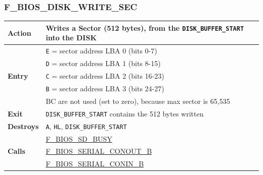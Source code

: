 \documentclass[a4paper,11pt]{article}
\begin{document}
        \subsubsection{F\_BIOS\_DISK\_WRITE\_SEC}
        \label{func:fbiosdiskwritesec}
        \begin{tabular}{l p{9cm}}
            \hline\textbf{Action}
            & Writes a Sector (512 bytes), from the \texttt{DISK\_BUFFER\_START}
            into the \textbf{DISK}\\
            \hline\multirow[t]{5}{4em}{\textbf{Entry}}
            & \texttt{E} = sector address LBA 0 (bits 0-7) \\
            & \texttt{D} = sector address LBA 1 (bits 8-15) \\
            & \texttt{C} = sector address LBA 2 (bits 16-23) \\
            & \texttt{B} = sector address LBA 3 (bits 24-27) \\
            & BC are not used (set to zero), because max sector is 65,535\\
            \hline\textbf{Exit} & \texttt{DISK\_BUFFER\_START} contains the 512 bytes written \\
            \hline\textbf{Destroys} & \texttt{A}, \texttt{HL}, \texttt{DISK\_BUFFER\_START} \\
            \hline\multirow[t]{3}{4em}{\textbf{Calls}}
            & \hyperref[func:fbiossdbusywait]{F\_BIOS\_SD\_BUSY}\\
            & \hyperref[func:fbiosserialconoutb]{F\_BIOS\_SERIAL\_CONOUT\_B}\\
            & \hyperref[func:fbiosserialconinb]{F\_BIOS\_SERIAL\_CONIN\_B}\\
            \hline
        \end{tabular}

\end{document}
